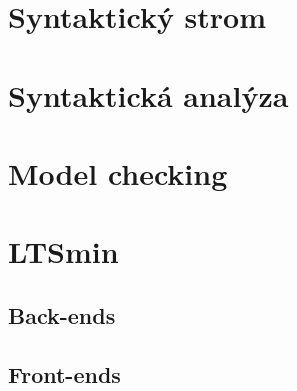 \section{Syntaktický strom}

\section{Syntaktická analýza}

\section{Model checking}

\section{LTSmin}

\subsection{Back-ends}

\subsection{Front-ends}